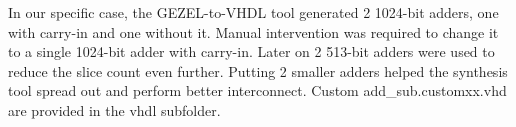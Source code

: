 In our specific case, the GEZEL-to-VHDL tool generated 2 1024-bit
adders, one with carry-in and one without it. Manual intervention was
required to change it to a single 1024-bit adder with carry-in. Later
on 2 513-bit adders were used to reduce the slice count even further.
Putting 2 smaller adders helped the synthesis tool spread out and
perform better interconnect.
Custom add\_sub.customxx.vhd are provided in the vhdl subfolder.

